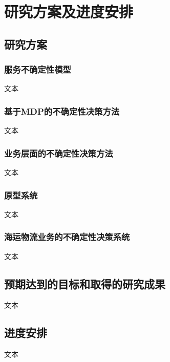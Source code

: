 \section{研究方案及进度安排}
\subsection{研究方案}
\subsubsection{服务不确定性模型}
文本

\subsubsection{基于MDP的不确定性决策方法}
文本

\subsubsection{业务层面的不确定性决策方法}
文本

\subsubsection{原型系统}
文本

\subsubsection{海运物流业务的不确定性决策系统}
文本


\subsection{预期达到的目标和取得的研究成果}
文本

\subsection{进度安排}
文本
